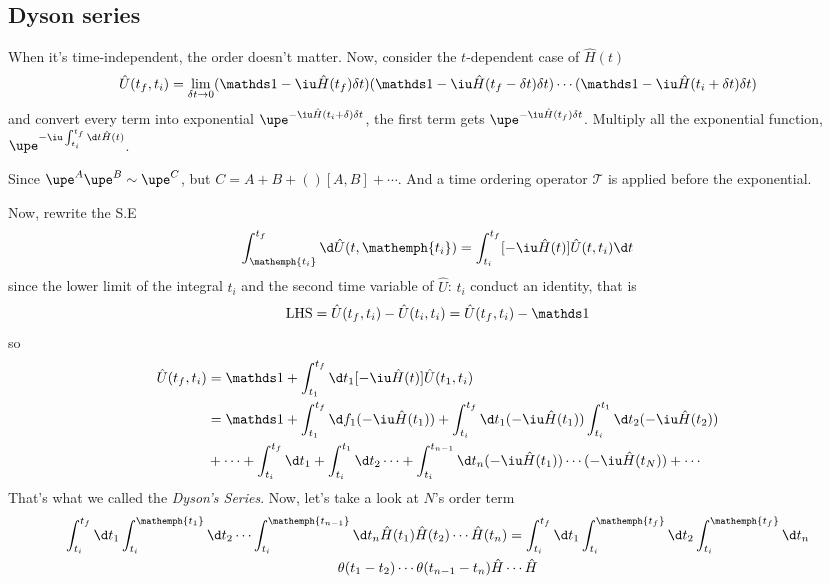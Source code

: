 \subsection{Dyson series}

When it's time-independent, the order doesn't matter.
Now, consider the $t$-dependent case of $\hat H(t)$
\[
  \hat U(t_f,t_i) = \lim_{\delta t\to0}
                    (\identity - \iu \hat H(t_f)\delta t)
                    (\identity - \iu \hat H(t_f - \delta t)\delta t)
                    \cdots
                    (\identity - \iu \hat H(t_i + \delta t)\delta t)
\]
and convert every term into exponential $\upe^{-\iu\hat H(t_i + \delta)\delta t}$, the first term gets $\upe^{-\iu\hat H(t_f)\delta t}$. Multiply all the exponential function, $\upe^{-\iu\int_{t_i}^{t_f} \d t \hat H(t)}$.
\begin{framed}
  Since $\upe^A\upe^B \sim \upe^C$, but $C = A + B + ()[A,B] + \cdots$.
  And a time ordering operator $\mathcal T$ is applied before the exponential.
\end{framed}
Now, rewrite the S.E
\begin{equation}
  \int_{\mathemph{t_i}}^{t_f} \d \hat U(t,\mathemph{t_i})
= \int_{t_i}^{t_f} [-\iu\hat H(t)] \hat U(t,t_i) \d t
\end{equation}
since the lower limit of the integral $t_i$
and the second time variable of $\hat U$: $t_i$ conduct an identity, that is
\[
  \text{LHS} = \hat U(t_f,t_i) - \hat U(t_i,t_i) = \hat U(t_f,t_i) - \identity
\]
so
\begin{align*}
  \hat U(t_f,t_i) & = \identity + \int_{t_1}^{t_f} \d t_1
                    [-\iu \hat H(t)] \hat U(t_1,t_i)\\
& = \identity + \int_{t_1}^{t_f} \d f_1 (-\iu \hat H(t_1))
  + \int_{t_i}^{t_f} \d t_1 (-\iu \hat H(t_1)) \int_{t_i}^{t_1} \d t_2
    (-\iu\hat H(t_2))\\
& + \cdots + \int_{t_i}^{t_f} \d t_1 + \int_{t_i}^{t_1} \d t_2 \cdots
  + \int_{t_i}^{t_{n-1}} \d t_n (-\iu \hat H(t_1)) \cdots (-\iu\hat H(t_N)) + \cdots
\end{align*}
That's what we called the \emph{Dyson's Series}.
Now, let's take a look at $N$'s order term
\begin{multline}
  \int_{t_i}^{t_f} \d t_1
  \int_{t_i}^{\mathemph{t_1}} \d t_2
  \cdots
  \int_{t_i}^{\mathemph{t_{n-1}}} \d t_n
  \hat H(t_1) \hat H(t_2) \cdots \hat H(t_n)
= \int_{t_i}^{t_f} \d t_1
  \int_{t_i}^{\mathemph{t_f}} \d t_2
  \int_{t_i}^{\mathemph{t_f}} \d t_n\\
  \theta(t_1 - t_2) \cdots \theta(t_{n-1} - t_n)
  \hat H \cdots \hat H
\end{multline}
